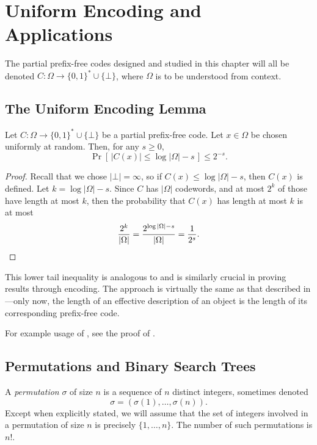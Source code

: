 \chapter{Uniform Encoding and Applications}
The partial prefix-free codes designed and studied in this chapter
will all be denoted $C : \Omega \to \{0, 1\}^* \cup \{\bot\}$, where
$\Omega$ is to be understood from context.

\section{The Uniform Encoding Lemma}

\begin{lem}
  Let $C : \Omega \to \{0, 1\}^* \cup \{\bot\}$ be a partial
  prefix-free code. Let $x \in \Omega$ be chosen uniformly at
  random. Then, for any $s \geq 0$,
  \[\Pr\left[\,|C(x)| \leq \log |\Omega| - s\,\right]
  \leq 2^{-s}.\]
\end{lem}
\begin{proof}
  Recall that we chose $|\bot| = \infty$, so if
  $C(x) \leq \log |\Omega| - s$, then $C(x)$ is defined.
  Let $k = \log |\Omega| - s$. Since $C$ has $|\Omega|$ codewords, and
  at most $2^k$ of those have length at most $k$, then the probability
  that $C(x)$ has length at most $k$ is at most
  \[\frac{2^{k}}{|\Omega|} = \frac{2^{\log |\Omega| - s}}{|\Omega|} =
  \frac{1}{2^s}. \qedhere\]
\end{proof}

This lower tail inequality is analogous to 
and is similarly crucial in proving results through encoding. The
approach is virtually the same as that described in
---only now, the length of an effective
description of an object is the length of its corresponding
prefix-free code.

For example usage of , see the proof of
.

\section{Permutations and Binary Search Trees}

\begin{defn}
  A \emph{permutation} $\sigma$ of size $n$ is a sequence of $n$
  distinct integers, sometimes denoted
  \[\sigma = (\sigma(1), \ldots, \sigma(n)).\]
  Except when explicitly stated, we will assume that the set of
  integers involved in a permutation of size $n$ is precisely
  $\{1, \ldots, n\}$. The number of such permutations is $n!$.
\end{defn}

